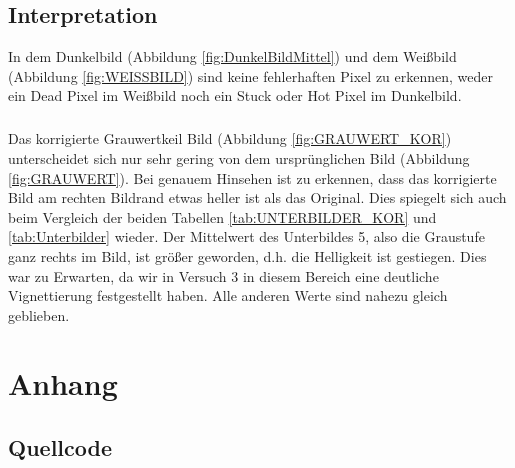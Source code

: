 \documentclass[12pt,oneside,a4paper]{report}
\begin{document}
\section{Interpretation}
\label{chap:VERSUCH_4_INTERPRETATION}

In dem Dunkelbild (Abbildung \ref{fig:DunkelBildMittel}) und dem Weißbild (Abbildung \ref{fig:WEISSBILD}) sind keine fehlerhaften Pixel zu erkennen, weder ein Dead Pixel im Weißbild noch ein Stuck oder Hot Pixel im Dunkelbild.

\paragraph{}
Das korrigierte Grauwertkeil Bild (Abbildung \ref{fig:GRAUWERT_KOR}) unterscheidet sich nur sehr gering von dem ursprünglichen Bild (Abbildung \ref{fig:GRAUWERT}). Bei genauem Hinsehen ist zu erkennen, dass das korrigierte Bild am rechten Bildrand etwas heller ist als das Original. Dies spiegelt sich auch beim Vergleich der beiden Tabellen \ref{tab:UNTERBILDER_KOR} und \ref{tab:Unterbilder} wieder. Der Mittelwert des Unterbildes 5, also die Graustufe ganz rechts im Bild, ist größer geworden, d.h. die Helligkeit ist gestiegen.
Dies war zu Erwarten, da wir in Versuch 3 in diesem Bereich eine deutliche Vignettierung festgestellt haben. Alle anderen Werte sind nahezu gleich geblieben.
%
%
\renewcommand\thesection{A.\arabic{section}}
\renewcommand\thesubsection{\thesection.\arabic{subsection}}

\chapter*{Anhang}
\label{chap:APPENDIX}
\addtocounter{chapter}{1}
\setcounter{section}{0}

\section{Quellcode}
\label{chap:APPENDIX_SOURCECODE}
\end{document}
